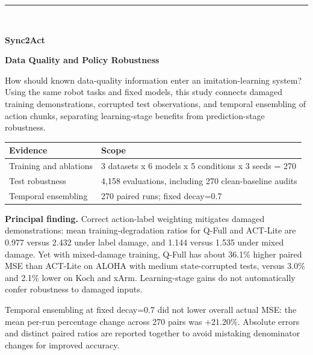 \documentclass[11pt,a4paper]{article}
\newcommand{\note}[1]{\begin{tcolorbox}[colback=panel,colframe=rule,boxrule=0.5pt,arc=1mm]#1\end{tcolorbox}}
\begin{document}
\thispagestyle{empty}
\vspace*{12mm}
{\color{blue}\rule{25mm}{2.5pt}}\\[7mm]
{\fontsize{30}{36}\selectfont\bfseries\color{navy}Sync2Act\par}
\vspace{5mm}
{\LARGE\bfseries\color{navy}Data Quality and Policy Robustness\par}
\vspace{5mm}{\large v1\_4\_0 / 2026-10-07}\par\vspace{6mm}
\note{How should known data-quality information enter an imitation-learning system? Using the same robot tasks and fixed models, this study connects damaged training demonstrations, corrupted test observations, and temporal ensembling of action chunks, separating learning-stage benefits from prediction-stage robustness.}
\begin{center}
\small
\begin{tabular}{lp{121mm}}
\toprule
Evidence & Scope \\
\midrule
Training and ablations & 3 datasets x 6 models x 5 conditions x 3 seeds = 270 \\
Test robustness & 4,158 evaluations, including 270 clean-baseline audits \\
Temporal ensembling & 270 paired runs; fixed decay=0.7 \\
\bottomrule
\end{tabular}
\end{center}
\textbf{Principal finding.} Correct action-label weighting mitigates damaged demonstrations: mean training-degradation ratios for Q-Full and ACT-Lite are 0.977 versus 2.432 under label damage, and 1.144 versus 1.535 under mixed damage. Yet with mixed-damage training, Q-Full has about 36.1\% higher paired MSE than ACT-Lite on ALOHA with medium state-corrupted tests, versus 3.0\% and 2.1\% lower on Koch and xArm. Learning-stage gains do not automatically confer robustness to damaged inputs.

Temporal ensembling at fixed decay=0.7 did not lower overall actual MSE: the mean per-run percentage change across 270 pairs was $+21.20\%$. Absolute errors and distinct paired ratios are reported together to avoid mistaking denominator changes for improved accuracy.
\end{document}
